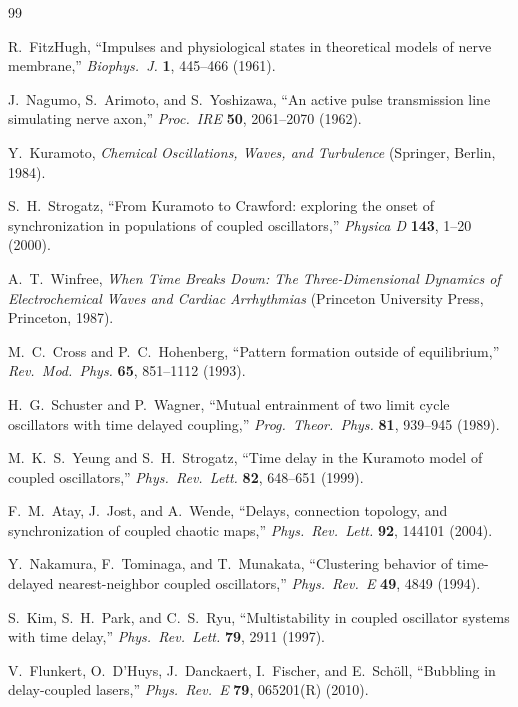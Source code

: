 \documentclass[11pt,a4paper]{article}
\begin{document}
\begin{thebibliography}{99}

R.~FitzHugh,
``Impulses and physiological states in theoretical models of
nerve membrane,''
\textit{Biophys.\ J.} \textbf{1}, 445--466 (1961).

J.~Nagumo, S.~Arimoto, and S.~Yoshizawa,
``An active pulse transmission line simulating nerve axon,''
\textit{Proc.\ IRE} \textbf{50}, 2061--2070 (1962).

Y.~Kuramoto,
\textit{Chemical Oscillations, Waves, and Turbulence}
(Springer, Berlin, 1984).

S.~H.~Strogatz,
``From Kuramoto to Crawford: exploring the onset of
synchronization in populations of coupled oscillators,''
\textit{Physica D} \textbf{143}, 1--20 (2000).

A.~T.~Winfree,
\textit{When Time Breaks Down: The Three-Dimensional Dynamics
of Electrochemical Waves and Cardiac Arrhythmias}
(Princeton University Press, Princeton, 1987).

M.~C.~Cross and P.~C.~Hohenberg,
``Pattern formation outside of equilibrium,''
\textit{Rev.\ Mod.\ Phys.} \textbf{65}, 851--1112 (1993).

H.~G.~Schuster and P.~Wagner,
``Mutual entrainment of two limit cycle oscillators with
time delayed coupling,''
\textit{Prog.\ Theor.\ Phys.} \textbf{81}, 939--945 (1989).

M.~K.~S.~Yeung and S.~H.~Strogatz,
``Time delay in the Kuramoto model of coupled oscillators,''
\textit{Phys.\ Rev.\ Lett.} \textbf{82}, 648--651 (1999).

F.~M.~Atay, J.~Jost, and A.~Wende,
``Delays, connection topology, and synchronization of coupled
chaotic maps,''
\textit{Phys.\ Rev.\ Lett.} \textbf{92}, 144101 (2004).

Y.~Nakamura, F.~Tominaga, and T.~Munakata,
``Clustering behavior of time-delayed nearest-neighbor
coupled oscillators,''
\textit{Phys.\ Rev.\ E} \textbf{49}, 4849 (1994).

S.~Kim, S.~H.~Park, and C.~S.~Ryu,
``Multistability in coupled oscillator systems with
time delay,''
\textit{Phys.\ Rev.\ Lett.} \textbf{79}, 2911 (1997).

V.~Flunkert, O.~D'Huys, J.~Danckaert, I.~Fischer, and
E.~Sch{\"o}ll,
``Bubbling in delay-coupled lasers,''
\textit{Phys.\ Rev.\ E} \textbf{79}, 065201(R) (2010).


\end{thebibliography}
\end{document}
